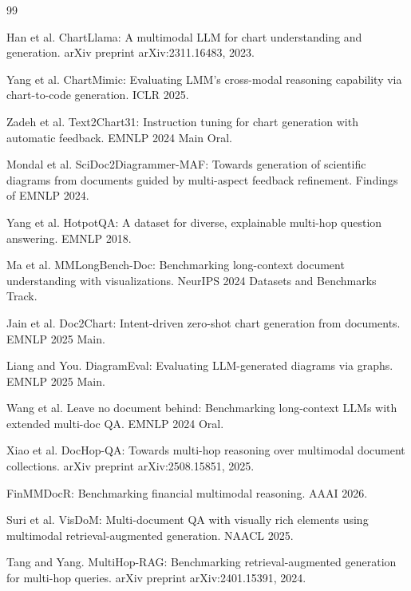 \documentclass[11pt]{article}
\begin{document}

\begin{thebibliography}{99}

Han et al. ChartLlama: A multimodal LLM for chart understanding and generation. arXiv preprint arXiv:2311.16483, 2023.

Yang et al. ChartMimic: Evaluating LMM's cross-modal reasoning capability via chart-to-code generation. ICLR 2025.

Zadeh et al. Text2Chart31: Instruction tuning for chart generation with automatic feedback. EMNLP 2024 Main Oral.

Mondal et al. SciDoc2Diagrammer-MAF: Towards generation of scientific diagrams from documents guided by multi-aspect feedback refinement. Findings of EMNLP 2024.

Yang et al. HotpotQA: A dataset for diverse, explainable multi-hop question answering. EMNLP 2018.

Ma et al. MMLongBench-Doc: Benchmarking long-context document understanding with visualizations. NeurIPS 2024 Datasets and Benchmarks Track.

Jain et al. Doc2Chart: Intent-driven zero-shot chart generation from documents. EMNLP 2025 Main.

Liang and You. DiagramEval: Evaluating LLM-generated diagrams via graphs. EMNLP 2025 Main.

Wang et al. Leave no document behind: Benchmarking long-context LLMs with extended multi-doc QA. EMNLP 2024 Oral.

Xiao et al. DocHop-QA: Towards multi-hop reasoning over multimodal document collections. arXiv preprint arXiv:2508.15851, 2025.

FinMMDocR: Benchmarking financial multimodal reasoning. AAAI 2026.

Suri et al. VisDoM: Multi-document QA with visually rich elements using multimodal retrieval-augmented generation. NAACL 2025.

Tang and Yang. MultiHop-RAG: Benchmarking retrieval-augmented generation for multi-hop queries. arXiv preprint arXiv:2401.15391, 2024.


\end{thebibliography}
\end{document}
